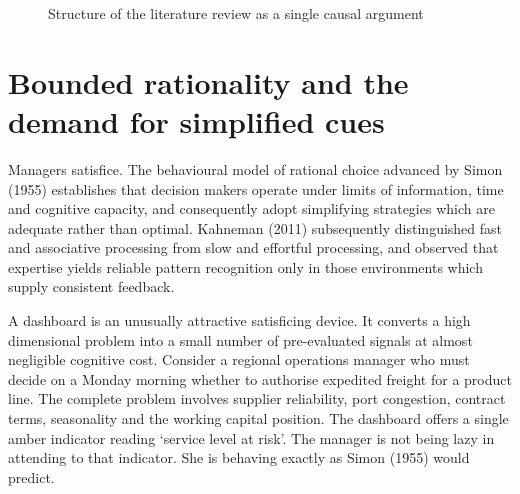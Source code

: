 \documentclass[12pt,a4paper]{article}
\begin{document}
\begin{figure}[H]
\centering
{}
\caption{Structure of the literature review as a single causal argument}
\label{fig:lrstructure}
\end{figure}

\section{Bounded rationality and the demand for simplified cues}

Managers satisfice. The behavioural model of rational choice advanced by Simon (1955) establishes that
decision makers operate under limits of information, time and cognitive capacity, and consequently adopt
simplifying strategies which are adequate rather than optimal. Kahneman (2011) subsequently distinguished
fast and associative processing from slow and effortful processing, and observed that expertise yields
reliable pattern recognition only in those environments which supply consistent feedback.

A dashboard is an unusually attractive satisficing device. It converts a high dimensional problem
into a small number of pre-evaluated signals at almost negligible cognitive cost. Consider a
regional operations manager who must decide on a Monday morning whether to authorise expedited
freight for a product line. The complete problem involves supplier reliability, port congestion,
contract terms, seasonality and the working capital position. The dashboard offers a single amber
indicator reading `service level at risk'. The manager is not being lazy in attending to that
indicator. She is behaving exactly as Simon (1955) would predict.
\end{document}
